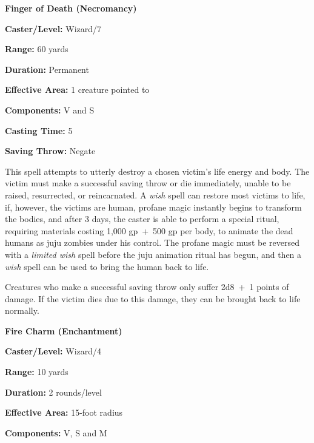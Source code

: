 \begin{multicols}{2}
\vspace{1em}

\noindent
\begin{minipage}{\columnwidth}

\noindent \textbf{Finger of Death (Necromancy)}

\noindent \textbf{Caster/Level:} Wizard/7

\noindent \textbf{Range:} 60 yards

\noindent \textbf{Duration:} Permanent

\noindent \textbf{Effective Area:} 1 creature pointed to

\noindent \textbf{Components:} V and S

\noindent \textbf{Casting Time:} 5

\noindent \textbf{Saving Throw:} Negate

\end{minipage}

This spell attempts to utterly destroy a chosen victim's life energy and body.  The victim must make a successful saving throw or die immediately, unable to be raised, resurrected, or reincarnated.  A \textit{wish} spell can restore most victims to life, if, however, the victims are human, profane magic instantly begins to transform the bodies, and after 3 days, the caster is able to perform a special ritual, requiring materials costing 1,000 gp~+~500 gp per body, to animate the dead humans as juju zombies under his control.  The profane magic must be reversed with a \textit{limited wish} spell before the juju animation ritual has begun, and then a \textit{wish} spell can be used to bring the human back to life.

Creatures who make a successful saving throw only suffer 2d8~+~1 points of damage.  If the victim dies due to this damage, they can be brought back to life normally.

\vspace{1em}

\noindent
\begin{minipage}{\columnwidth}

\noindent \textbf{Fire Charm (Enchantment)}

\noindent \textbf{Caster/Level:} Wizard/4

\noindent \textbf{Range:} 10 yards

\noindent \textbf{Duration:} 2 rounds/level

\noindent \textbf{Effective Area:} 15-foot radius

\noindent \textbf{Components:} V, S and M


\end{minipage}
\end{multicols}
